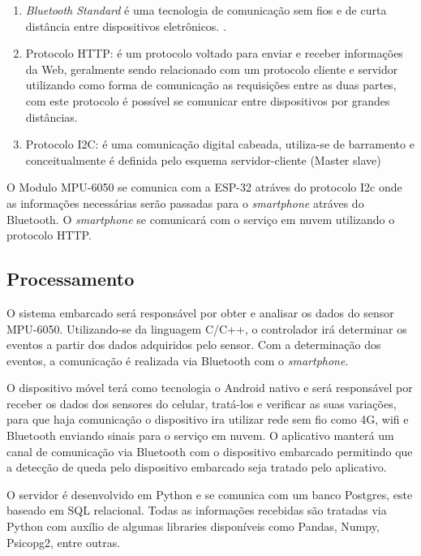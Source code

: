 \begin{enumerate}
    \item\textit{Bluetooth Standard} é uma tecnologia de comunicação sem fios e de curta distância entre dispositivos eletrônicos. \cite{heydon2013bluetooth}.
    \item Protocolo HTTP: é um protocolo voltado para enviar e receber informações da Web, geralmente  sendo relacionado com um protocolo cliente e servidor utilizando como forma de comunicação as requisições entre as duas partes, com este protocolo é possível se comunicar entre dispositivos por grandes distâncias\cite{tanenbaum2003redes}.
    
    \item Protocolo I2C: é uma comunicação digital cabeada, utiliza-se de barramento e conceitualmente é definida pelo esquema servidor-cliente (Master slave)\cite{paret1997i2c}
\end{enumerate}
O Modulo MPU-6050 se comunica com a ESP-32 atráves do protocolo I2c onde as informações necessárias serão passadas para o  \textit{smartphone} atráves do Bluetooth. O \textit{smartphone} se comunicará com o serviço em nuvem utilizando o protocolo HTTP.





\subsection{\textbf{Processamento}}


      O sistema embarcado será responsável por obter e analisar os dados do sensor MPU-6050. Utilizando-se da linguagem C/C++, o controlador irá determinar os eventos a partir dos dados adquiridos pelo sensor. Com a determinação dos eventos, a comunicação é realizada via Bluetooth com o \textit{smartphone}.
    
     O dispositivo móvel terá como tecnologia o Android nativo e será responsável por receber os dados dos sensores do celular, tratá-los e verificar as suas variações, para que haja  comunicação o dispositivo ira utilizar rede sem fio como 4G, wifi e Bluetooth enviando sinais para o serviço em nuvem. O aplicativo manterá um canal de comunicação via Bluetooth com o dispositivo embarcado permitindo que a detecção de queda pelo dispositivo embarcado seja tratado pelo aplicativo.
    
     O servidor é desenvolvido em Python e se comunica com um banco Postgres, este baseado em SQL relacional. Todas as informações recebidas são tratadas via Python com auxílio de algumas libraries disponíveis como Pandas, Numpy, Psicopg2, entre outras.



